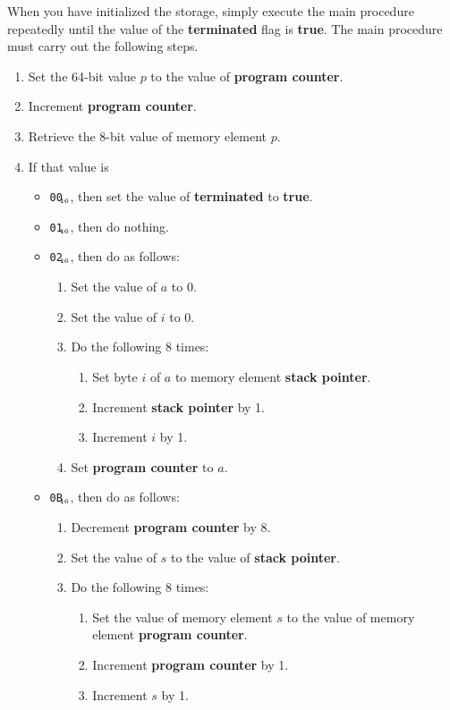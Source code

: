 \documentclass[a4paper,11pt]{article}
\newcommand{\PC}{\textbf{program counter}\xspace}
\newcommand{\SP}{\textbf{stack pointer}\xspace}
\newcommand{\TERM}{\textbf{terminated}\xspace}
\newcommand{\T}{\textbf{true}\xspace}
\newcommand{\num}[1]{\texttt{#1}\xspace}
\newcommand{\hex}[1]{\num{#1}$_{\textup{\tiny\hskip-1ex 16}}$\xspace}
\newcommand{\op}[1]{#1}
\newcommand{\EXIT}    [1]{\op{\hex{00}}\xspace}
\newcommand{\NOP}     [1]{\op{\hex{01}}\xspace}
\newcommand{\JUMP}    [1]{\op{\hex{02}}\xspace}
\newcommand{\PUSHL}   [1]{\op{\hex{0B}}\xspace}
\begin{document}
When you have initialized the storage, simply execute the main procedure repeatedly until the value of the \TERM flag is \T.
The main procedure must carry out the following steps.
\begin{enumerate}
\item Set the 64-bit value $p$ to the value of \PC.
\item Increment \PC.
\item Retrieve the 8-bit value of memory element $p$.
\item If that value is
  \begin{itemize}
  \item \EXIT{}, then set the value of  \TERM to \T.
  \item \NOP{}, then do nothing.
  \item \JUMP{}, then do as follows:
    \begin{enumerate}
    \item Set the value of $a$ to 0.
    \item Set the value of $i$ to 0.
    \item Do the following 8 times:
      \begin{enumerate}
      \item Set byte $i$ of $a$ to memory element \SP.
      \item Increment \SP by 1.
      \item Increment $i$ by 1.
      \end{enumerate}
    \item Set \PC to $a$.
    \end{enumerate}
  \item \PUSHL{}, then do as follows:
    \begin{enumerate}
    \item Decrement \PC by 8.
    \item Set the value of $s$ to the value of \SP.
    \item Do the following 8 times:
      \begin{enumerate}
      \item Set the value of memory element $s$ to the value of memory element \PC.
      \item Increment \PC by 1.
      \item Increment $s$ by 1.
      \end{enumerate}
    \end{enumerate}
  \end{itemize}
\end{enumerate}
\end{document}

